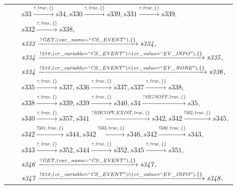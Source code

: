 \begin{tabular}{lcp{350px}}
& & $\mathit{s33}\xrightarrow{\mathit{\tau}, \mathit{true}, \{\}}\mathit{s34},\mathit{s330}\xrightarrow{\mathit{\tau}, \mathit{true}, \{\}}\mathit{s339},\mathit{s331}\xrightarrow{\mathit{\tau}, \mathit{true}, \{\}}\mathit{s339},$ \\
& & $\mathit{s332}\xrightarrow{\mathit{\tau}, \mathit{true}, \{\}}\mathit{s338},$ \\
& & $\mathit{s333}\xrightarrow{\mathit{?GET}, \mathit{(var\_name = ``CS\_EVENT")}, \{\}}\mathit{s334},$ \\
& & $\mathit{s334}\xrightarrow{\mathit{!210}, \mathit{(cr\_variable = ``CS\_EVENT") \land (cr\_value = ``EV\_INFO")}, \{\}}\mathit{s335},$ \\
& & $\mathit{s334}\xrightarrow{\mathit{!210}, \mathit{(cr\_variable = ``CS\_EVENT") \land (cr\_value = ``EV\_NONE")}, \{\}}\mathit{s336},$ \\
& & $\mathit{s335}\xrightarrow{\mathit{\tau}, \mathit{true}, \{\}}\mathit{s337},\mathit{s336}\xrightarrow{\mathit{\tau}, \mathit{true}, \{\}}\mathit{s337},\mathit{s337}\xrightarrow{\mathit{\tau}, \mathit{true}, \{\}}\mathit{s338},$ \\
& & $\mathit{s338}\xrightarrow{\mathit{\tau}, \mathit{true}, \{\}}\mathit{s339},\mathit{s339}\xrightarrow{\mathit{\tau}, \mathit{true}, \{\}}\mathit{s340},\mathit{s34}\xrightarrow{\mathit{?SIGNOFF}, \mathit{true}, \{\}}\mathit{s35},$ \\
& & $\mathit{s340}\xrightarrow{\mathit{\tau}, \mathit{true}, \{\}}\mathit{s357},\mathit{s341}\xrightarrow{\mathit{?RHCOPY\_EXIST}, \mathit{true}, \{\}}\mathit{s342},\mathit{s342}\xrightarrow{\mathit{!502}, \mathit{true}, \{\}}\mathit{s345},$ \\
& & $\mathit{s342}\xrightarrow{\mathit{!501}, \mathit{true}, \{\}}\mathit{s344},\mathit{s342}\xrightarrow{\mathit{!503}, \mathit{true}, \{\}}\mathit{s346},\mathit{s342}\xrightarrow{\mathit{!500}, \mathit{true}, \{\}}\mathit{s343},$ \\
& & $\mathit{s343}\xrightarrow{\mathit{\tau}, \mathit{true}, \{\}}\mathit{s352},\mathit{s344}\xrightarrow{\mathit{\tau}, \mathit{true}, \{\}}\mathit{s352},\mathit{s345}\xrightarrow{\mathit{\tau}, \mathit{true}, \{\}}\mathit{s351},$ \\
& & $\mathit{s346}\xrightarrow{\mathit{?GET}, \mathit{(var\_name = ``CS\_EVENT")}, \{\}}\mathit{s347},$ \\
& & $\mathit{s347}\xrightarrow{\mathit{!210}, \mathit{(cr\_variable = ``CS\_EVENT") \land (cr\_value = ``EV\_INFO")}, \{\}}\mathit{s348},$ \\

\end{tabular}
